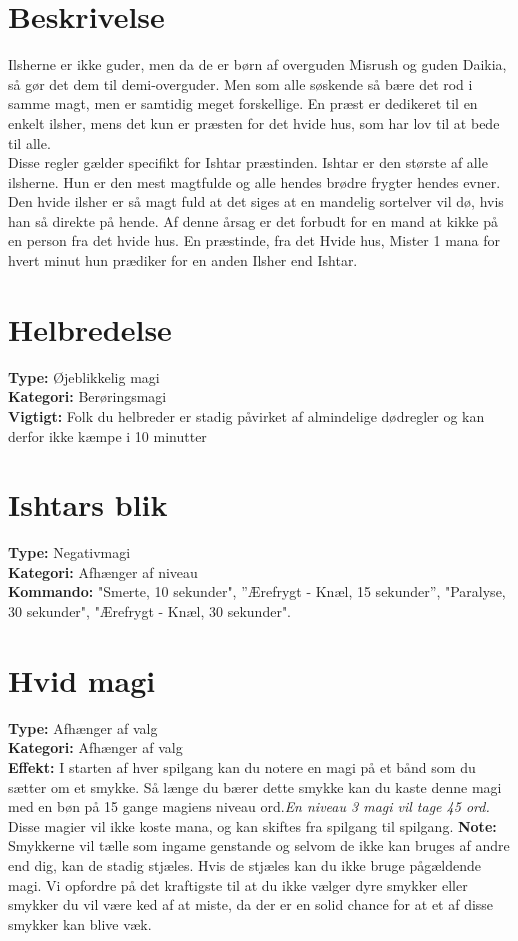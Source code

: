 \section{Beskrivelse}
Ilsherne er ikke guder, men da de er børn af overguden Misrush og guden Daikia, så gør det dem til demi-overguder. Men som alle søskende så bære det rod i samme magt, men er samtidig meget forskellige. En præst er dedikeret til en enkelt ilsher, mens det kun er præsten for det hvide hus, som har lov til at bede til alle.\\ 
Disse regler gælder specifikt for Ishtar præstinden. Ishtar er den største af alle ilsherne. Hun er den mest magtfulde og alle hendes brødre frygter hendes evner. Den hvide ilsher er så magt fuld at det siges at en mandelig sortelver vil dø, hvis han så direkte på hende. Af denne årsag er det forbudt for en mand at kikke på en person fra det hvide hus. En præstinde, fra det Hvide hus, Mister 1 mana for hvert minut hun prædiker for en anden Ilsher end Ishtar.

\section{Helbredelse}
\textbf{Type:} Øjeblikkelig magi \\
\textbf{Kategori:} Berøringsmagi\\
\textbf{Vigtigt:} Folk du helbreder er stadig påvirket af almindelige dødregler og kan derfor ikke kæmpe i 10 minutter


\section{Ishtars blik}
\textbf{Type:} Negativmagi\\
\textbf{Kategori:} Afhænger af niveau\\
\textbf{Kommando:} "Smerte, 10 sekunder", ”Ærefrygt - Knæl, 15 sekunder”, "Paralyse, 30 sekunder", "Ærefrygt - Knæl, 30 sekunder".


\section{Hvid magi}
\textbf{Type:} Afhænger af valg\\
\textbf{Kategori:} Afhænger af valg \\
\textbf{Effekt:} I starten af hver spilgang kan du notere en magi på et bånd som du sætter om et smykke. Så længe du bærer dette smykke kan du kaste denne magi med en bøn på 15 gange magiens niveau ord.\textit{En niveau 3 magi vil tage 45 ord.} Disse magier vil ikke koste mana, og kan skiftes fra spilgang til spilgang.
\textbf{Note:} Smykkerne vil tælle som ingame genstande og selvom de ikke kan bruges af andre end dig, kan de stadig stjæles. Hvis de stjæles kan du ikke bruge pågældende magi. Vi opfordre på det kraftigste til at du ikke vælger dyre smykker eller smykker du vil være ked af at miste, da der er en solid chance for at et af disse smykker kan blive væk.

